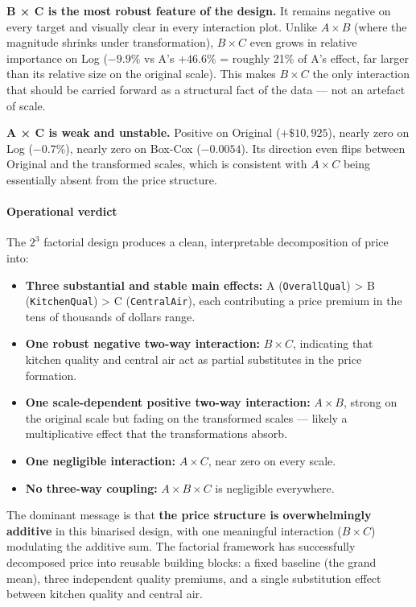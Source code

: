 \textbf{B × C is the most robust feature of the design.} It remains
negative on every target and visually clear in every interaction plot.
Unlike \(A \times B\) (where the magnitude shrinks under
transformation), \(B \times C\) even grows in relative importance on Log
(\(-9.9\%\) vs A's \(+46.6\%\) = roughly 21\% of A's effect, far larger
than its relative size on the original scale). This makes \(B \times C\)
the only interaction that should be carried forward as a structural fact
of the data --- not an artefact of scale.

\textbf{A × C is weak and unstable.} Positive on Original
(\(+\$10{,}925\)), nearly zero on Log (\(-0.7\%\)), nearly zero on
Box-Cox (\(-0.0054\)). Its direction even flips between Original and the
transformed scales, which is consistent with \(A \times C\) being
essentially absent from the price structure.

\paragraph{Operational verdict}\label{operational-verdict-1}

The \(2^3\) factorial design produces a clean, interpretable
decomposition of price into:

\begin{itemize}
\tightlist
\item
  \textbf{Three substantial and stable main effects:} A
  (\texttt{OverallQual}) \textgreater{} B (\texttt{KitchenQual})
  \textgreater{} C (\texttt{CentralAir}), each contributing a price
  premium in the tens of thousands of dollars range.
\item
  \textbf{One robust negative two-way interaction:} \(B \times C\),
  indicating that kitchen quality and central air act as partial
  substitutes in the price formation.
\item
  \textbf{One scale-dependent positive two-way interaction:}
  \(A \times B\), strong on the original scale but fading on the
  transformed scales --- likely a multiplicative effect that the
  transformations absorb.
\item
  \textbf{One negligible interaction:} \(A \times C\), near zero on
  every scale.
\item
  \textbf{No three-way coupling:} \(A \times B \times C\) is negligible
  everywhere.
\end{itemize}

The dominant message is that \textbf{the price structure is
overwhelmingly additive} in this binarised design, with one meaningful
interaction (\(B \times C\)) modulating the additive sum. The factorial
framework has successfully decomposed price into reusable building
blocks: a fixed baseline (the grand mean), three independent quality
premiums, and a single substitution effect between kitchen quality and
central air.

